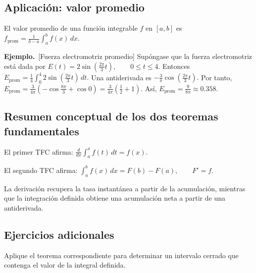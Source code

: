 \documentclass[12pt]{article}
\newenvironment{Ejem}
{\par\medskip\noindent\textbf{Ejemplo.}\ }
{\par\medskip}
\begin{document}
\subsection*{Aplicación: valor promedio}
El valor promedio de una función integrable $f$ en $[a,b]$ es
$
\boxed{
f_{\mathrm{prom}}
=
\frac{1}{b-a}\int_a^b f(x)\,dx.
}
$

\begin{Ejem}[Fuerza electromotriz promedio]
Supóngase que la fuerza electromotriz está dada por
$
E(t)=2\sin\left(\frac{2\pi}{3}t\right),
\qquad 0\le t\le4.
$
Entonces
$
E_{\mathrm{prom}}
=
\frac14\int_0^4
2\sin\left(\frac{2\pi}{3}t\right)\,dt.
$
Una antiderivada es
$
-\frac{3}{\pi}
\cos\left(\frac{2\pi}{3}t\right).
$
Por tanto,
$
E_{\mathrm{prom}}
=
\frac{3}{4\pi}
\left(
-\cos\frac{8\pi}{3}
+\cos0
\right)
=
\frac{3}{4\pi}\left(\frac12+1\right).
$
Así,
$
\boxed{
E_{\mathrm{prom}}
=
\frac{9}{8\pi}
\approx0.358.
}
$

\end{Ejem}
\subsection*{Resumen conceptual de los dos teoremas fundamentales}
El primer TFC afirma:
$
\boxed{
\frac{d}{dx}
\int_a^x f(t)\,dt=f(x).
}
$

El segundo TFC afirma:
$
\boxed{
\int_a^b f(x)\,dx
=
F(b)-F(a),
\qquad F'=f.
}
$


La derivación recupera la tasa instantánea a partir de la acumulación, mientras
que la integración definida obtiene una acumulación neta a partir de una
antiderivada.

\subsection*{Ejercicios adicionales}

Aplique el teorema correspondiente para determinar un intervalo cerrado que contenga el valor de la integral definida.
\end{document}
